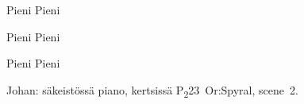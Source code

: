 \documentclass[12pt,a4paper]{article}
\begin{document}
\begin{SBChorus}
Pieni     Pieni
   
\end{SBChorus}

\begin{SBVerse*}
\end{SBVerse*}

\begin{SBChorus}
Pieni     Pieni
   
\end{SBChorus}

\begin{SBVerse*}
    
 
\end{SBVerse*}

\begin{SBChorus}
Pieni     Pieni
   
\end{SBChorus}


{\SBLyricNoteFont Johan: säkeistössä piano, kertsissä
P\textsubscript{2}23~Or:Spyral, scene~2.}
\end{document}
